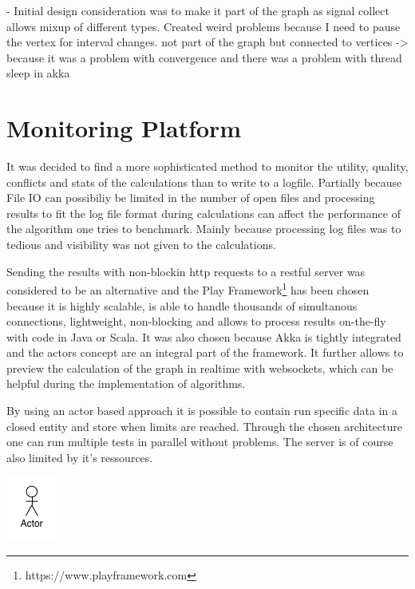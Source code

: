 - Initial design consideration was to make it part of the graph as signal collect allows mixup of different types. Created weird problems because I need to pause the vertex for interval changes. not part of the graph but connected to vertices -> because it was a problem with convergence and there was a problem with thread sleep in akka

\section{Monitoring Platform}

It was decided to find a more sophisticated method to monitor the utility, quality, conflicts and stats of the calculations than to write to a logfile. Partially because File IO can possibiliy be limited in the number of open files and processing results to fit the log file format during calculations can affect the performance of the algorithm one tries to benchmark. Mainly because processing log files was to tedious and visibility was not given to the calculations.

Sending the results with non-blockin http requests to a restful server was considered to be an alternative and the Play Framework\footnote{https://www.playframework.com} has been chosen because it is highly scalable, is able to handle thousands of simultanous connections, lightweight, non-blocking and allows to process results on-the-fly with code in Java or Scala. It was also chosen because Akka is tightly integrated and the actors concept are an integral part of the framework. It further allows to preview the calculation of the graph in realtime with websockets, which can be helpful during the implementation of algorithms.

By using an actor based approach it is possible to contain run specific data in a closed entity and store when limits are reached. Through the chosen architecture one can run multiple tests in parallel without problems. The server is of course also limited by it's ressources.

\includegraphics{graphics/monitoring}


